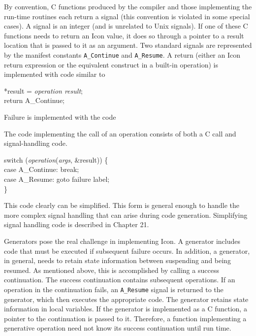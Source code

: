 By convention, C functions produced by the compiler and those
implementing the run-time routines each return a signal (this
convention is violated in some special cases). A signal is an integer
(and is unrelated to Unix signals). If one of these C functions needs
to return an Icon value, it does so through a pointer to a result
location that is passed to it as an argument. Two standard signals are
represented by the manifest constants \texttt{A\_Continue} and
\texttt{A\_Resume}. A return (either an Icon return expression or
the equivalent construct in a built-in operation) is implemented with
code similar to

\goodbreak
\begin{iconcode}
*result = \textit{operation result};\\
return A\_Continue;\\
\end{iconcode}

\noindent Failure is implemented with the code 



\noindent The code implementing the call of an operation consists of
both a C call and signal-handling code.

\goodbreak
\begin{iconcode}
switch (\textit{operation}(\textit{args}, \&result)) \{\\
\>case A\_Continue: break;\\
\>case A\_Resume: goto failure label;\\
\}\\
\end{iconcode}


This code clearly can be simplified. This form is general enough to
handle the more complex signal handling that can arise during code
generation. Simplifying signal handling code is described in Chapter
21.


Generators pose the real challenge in implementing Icon. A generator
includes code that must be executed if subsequent failure occurs. In
addition, a generator, in general, needs to retain state information
between suspending and being resumed. As mentioned above, this is
accomplished by calling a success continuation. The success
continuation contains subsequent operations. If an operation in the
continuation fails, an \texttt{A\_Resume} signal is returned to the generator,
which then executes the appropriate code. The generator retains state
information in local variables. If the generator is implemented as a C
function, a pointer to the continuation is passed to it. Therefore, a
function implementing a generative operation need not know its success
continuation until run time.


